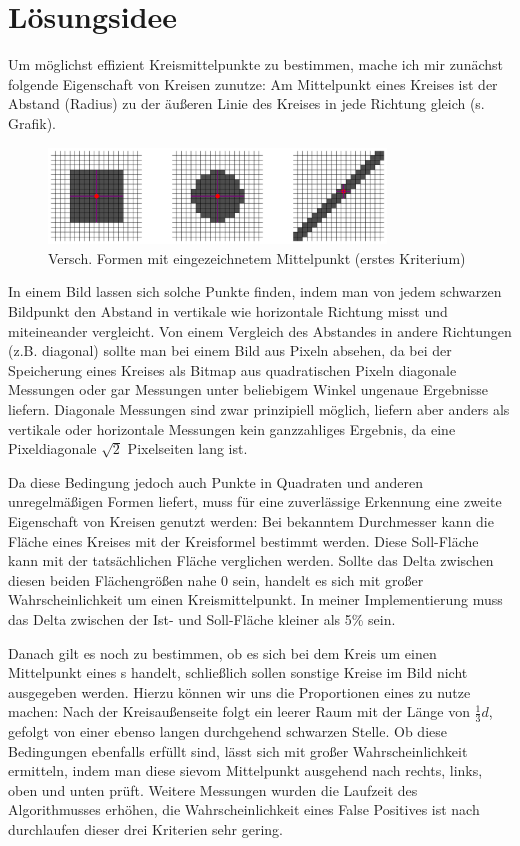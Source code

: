 \section{Lösungsidee}
Um möglichst effizient Kreismittelpunkte zu bestimmen, mache ich mir zunächst folgende Eigenschaft von Kreisen zunutze: Am Mittelpunkt eines Kreises ist der Abstand (Radius) zu der äußeren Linie des Kreises in jede Richtung gleich (s. Grafik).

\begin{figure}[!ht]
	\centering	
	\includegraphics[width=0.8\textwidth]{durchmesservergleich}
	\caption{Versch. Formen mit eingezeichnetem Mittelpunkt (erstes Kriterium)}
\end{figure}

In einem Bild lassen sich solche Punkte finden, indem man von jedem schwarzen Bildpunkt den Abstand in vertikale wie horizontale Richtung misst und miteineander vergleicht. Von einem Vergleich des Abstandes in andere Richtungen (z.B. diagonal) sollte man bei einem Bild aus Pixeln absehen, da bei der Speicherung eines Kreises als Bitmap aus quadratischen Pixeln diagonale Messungen oder gar Messungen unter beliebigem Winkel ungenaue Ergebnisse liefern. Diagonale Messungen sind zwar prinzipiell möglich, liefern aber anders als vertikale oder horizontale Messungen kein ganzzahliges Ergebnis, da eine Pixeldiagonale \(\sqrt{2}\) Pixelseiten lang ist.

Da diese Bedingung jedoch auch Punkte in Quadraten und anderen unregelmäßigen Formen liefert, muss für eine zuverlässige Erkennung eine zweite Eigenschaft von Kreisen genutzt werden: Bei bekanntem Durchmesser kann die Fläche eines Kreises mit der Kreisformel bestimmt werden. Diese Soll-Fläche kann mit der tatsächlichen Fläche verglichen werden. Sollte das Delta zwischen diesen beiden Flächengrößen nahe 0 sein, handelt es sich mit großer Wahrscheinlichkeit um einen Kreismittelpunkt. In meiner Implementierung muss das Delta zwischen der Ist- und Soll-Fläche kleiner als 5\% sein.

Danach gilt es noch zu bestimmen, ob es sich bei dem Kreis um einen Mittelpunkt eines \task{}s handelt, schließlich sollen sonstige Kreise im Bild nicht ausgegeben werden. Hierzu können wir uns die Proportionen eines  zu nutze machen: Nach der Kreisaußenseite folgt ein leerer Raum mit der Länge von \(\frac{1}{3}d\), gefolgt von einer ebenso langen durchgehend schwarzen Stelle. Ob diese Bedingungen ebenfalls erfüllt sind, lässt sich mit großer Wahrscheinlichkeit ermitteln, indem man diese sievom Mittelpunkt ausgehend nach rechts, links, oben und unten prüft. Weitere Messungen wurden die Laufzeit des Algorithmusses erhöhen, die Wahrscheinlichkeit eines False Positives ist nach durchlaufen dieser drei Kriterien sehr gering.

